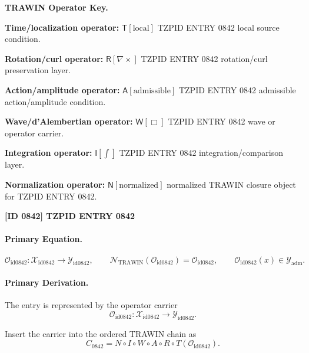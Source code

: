 \par\vspace{0.45\baselineskip}
\noindent\begin{minipage}[t]{\linewidth}
\begingroup
\small
\raggedright
\textbf{TRAWIN Operator Key.}\par
\noindent\textbf{Time/localization operator:} $\mathsf{T}\!\left[\mathrm{local}\right]$ TZPID ENTRY 0842 local source condition.\par
\noindent\textbf{Rotation/curl operator:} $\mathsf{R}\!\left[\nabla\times\right]$ TZPID ENTRY 0842 rotation/curl preservation layer.\par
\noindent\textbf{Action/amplitude operator:} $\mathsf{A}\!\left[\mathrm{admissible}\right]$ TZPID ENTRY 0842 admissible action/amplitude condition.\par
\noindent\textbf{Wave/d'Alembertian operator:} $\mathsf{W}\!\left[\Box\right]$ TZPID ENTRY 0842 wave or operator carrier.\par
\noindent\textbf{Integration operator:} $\mathsf{I}\!\left[\int\right]$ TZPID ENTRY 0842 integration/comparison layer.\par
\noindent\textbf{Normalization operator:} $\mathsf{N}\!\left[\mathrm{normalized}\right]$ normalized TRAWIN closure object for TZPID ENTRY 0842.\par
\endgroup
\end{minipage}

\clearpage
\noindent\textbf{[ID 0842] TZPID ENTRY 0842}\par
\vspace{0.35em}
\paragraph{Primary Equation.}
\[
\mathcal{O}_{\mathrm{id0842}}:\mathcal{X}_{\mathrm{id0842}}\longrightarrow \mathcal{Y}_{\mathrm{id0842}},\qquad
\mathcal{N}_{\mathrm{TRAWIN}}(\mathcal{O}_{\mathrm{id0842}})=\mathcal{O}_{\mathrm{id0842}},\qquad
\mathcal{O}_{\mathrm{id0842}}(x)\in\mathcal{Y}_{\mathrm{adm}}.
\]

\paragraph{Primary Derivation.} The entry is represented by the operator carrier\[
\mathcal{O}_{\mathrm{id0842}}:\mathcal{X}_{\mathrm{id0842}}\longrightarrow \mathcal{Y}_{\mathrm{id0842}}.
\]

Insert the carrier into the ordered TRAWIN chain as\[
C_{0842}=N\circ I\circ W\circ A\circ R\circ T(\mathcal{O}_{\mathrm{id0842}}).
\]

